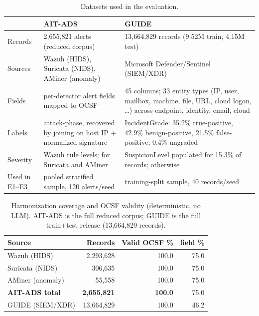 \begin{table}[t]
\caption{Datasets used in the evaluation.}
\label{tab:datasets}
\centering
\small
\begin{tabular}{@{}l p{6.1cm} p{6.6cm}@{}}
\toprule
 & \textbf{AIT-ADS}~\cite{aitads} & \textbf{GUIDE}~\cite{guide} \\
\midrule
Records       & 2,655,821 alerts (reduced corpus) & 13,664,829 records (9.52M train, 4.15M test) \\
Sources       & Wazuh (HIDS), Suricata (NIDS), AMiner (anomaly) & Microsoft Defender/Sentinel (SIEM/XDR) \\
Fields        & per-detector alert fields mapped to OCSF & 45 columns; 33 entity types (IP, user, mailbox, machine, file, URL, cloud logon, \ldots) across endpoint, identity, email, cloud \\
Labels        & attack-phase, recovered by joining on host IP + normalized signature & IncidentGrade: 35.2\% true-positive, 42.9\% benign-positive, 21.5\% false-positive, 0.4\% ungraded \\
Severity      & Wazuh rule levels; \unk{} for Suricata and AMiner & SuspicionLevel populated for 15.3\% of records; \unk{} otherwise \\
Used in E1--E3 & pooled stratified sample, 120 alerts/seed & training-split sample, 40 records/seed \\
\bottomrule
\end{tabular}
\end{table}

\begin{table}[t]
\caption{Harmonization coverage and OCSF validity (deterministic, no LLM). AIT-ADS is the full reduced corpus; GUIDE is the full train+test release (13,664,829 records).}
\label{tab:e1}
\centering
\begin{tabular}{lrrr}
\toprule
Source & Records & Valid OCSF \% & \unk{} field \% \\
\midrule
Wazuh (HIDS)     & 2,293,628 & 100.0 & 75.0 \\
Suricata (NIDS)  & 306,635 & 100.0 & 75.0 \\
AMiner (anomaly) & 55,558 & 100.0 & 75.0 \\
\textbf{AIT-ADS total} & \textbf{2,655,821} & \textbf{100.0} & 75.0 \\
\midrule
GUIDE (SIEM/XDR) & 13,664,829 & 100.0 & 46.2 \\
\bottomrule
\end{tabular}
\end{table}
